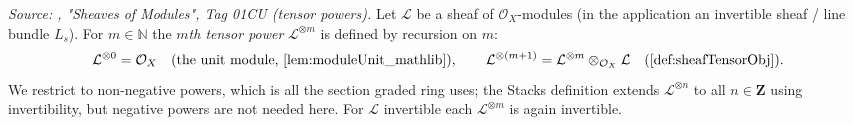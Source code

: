 \begin{definition}\leanok
  \label{def:sheafTensorPow}
  \textit{Source: \cite{stacks-project}, "Sheaves of Modules", Tag 01CU (tensor
  powers).}
  Let \(\mathcal{L}\) be a sheaf of \(\mathcal{O}_X\)-modules (in the application
  an invertible sheaf / line bundle \(L_s\)). For \(m \in \mathbb{N}\) the
  \emph{\(m\)th tensor power} \(\mathcal{L}^{\otimes m}\) is defined by recursion
  on \(m\):
  \[
    \mathcal{L}^{\otimes 0} = \mathcal{O}_X
      \quad(\text{the unit module, \cref{lem:moduleUnit_mathlib}}),
    \qquad
    \mathcal{L}^{\otimes (m+1)}
      = \mathcal{L}^{\otimes m} \otimes_{\mathcal{O}_X} \mathcal{L}
        \quad(\cref{def:sheafTensorObj}).
  \]
  We restrict to non-negative powers, which is all the section graded ring uses;
  the Stacks definition extends \(\mathcal{L}^{\otimes n}\) to all
  \(n \in \mathbf{Z}\) using invertibility, but negative powers are not needed
  here. For \(\mathcal{L}\) invertible each \(\mathcal{L}^{\otimes m}\) is again
  invertible.
\end{definition}

